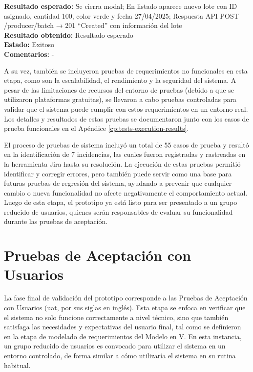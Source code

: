 \begin{center}
{\begin{minipage}{0.95\linewidth}
		\textbf{Resultado esperado:} Se cierra modal; En listado aparece nuevo lote con ID asignado, cantidad 100, color verde y fecha 27/04/2025; Respuesta API POST /producer/batch → 201 ``Created'' con información del lote \\
		\textbf{Resultado obtenido:} Resultado esperado \\
		\textbf{Estado:} Exitoso \\
		\textbf{Comentarios:} -
    \vspace{0.3cm}
  \end{minipage}
}
\end{center}

A su vez, también se incluyeron pruebas de requerimientos no funcionales en esta etapa, como son la escalabilidad, el rendimiento y la seguridad del sistema. A pesar de las limitaciones de recursos del entorno de pruebas (debido a que se utilizaron plataformas gratuitas), se llevaron a cabo pruebas controladas para validar que el sistema puede cumplir con estos requerimientos en un entorno real. Los detalles y resultados de estas pruebas se documentaron junto con los casos de prueba funcionales en el Apéndice \ref{cp:tests-execution-results}.

El proceso de pruebas de sistema incluyó un total de 55 casos de prueba y resultó en la identificación de 7 incidencias, las cuales fueron registradas y rastreadas en la herramienta Jira hasta su resolución. La ejecución de estas pruebas permitió identificar y corregir errores, pero también puede servir como una base para futuras pruebas de regresión del sistema, ayudando a prevenir que cualquier cambio o nueva funcionalidad no afecte negativamente el comportamiento actual. Luego de esta etapa, el prototipo ya está listo para ser presentado a un grupo reducido de usuarios, quienes serán responsables de evaluar su funcionalidad durante las pruebas de aceptación.

\section{Pruebas de Aceptación con Usuarios}
\label{sec:user-acceptance-testing}

La fase final de validación del prototipo corresponde a las Pruebas de Aceptación con Usuarios (\acrshort{uat}, por sus siglas en inglés). Esta etapa se enfoca en verificar que el sistema no solo funcione correctamente a nivel técnico, sino que también satisfaga las necesidades y expectativas del usuario final, tal como se definieron en la etapa de modelado de requerimientos del Modelo en V. En esta instancia, un grupo reducido de usuarios es convocado para utilizar el sistema en un entorno controlado, de forma similar a cómo utilizaría el sistema en su rutina habitual. 

